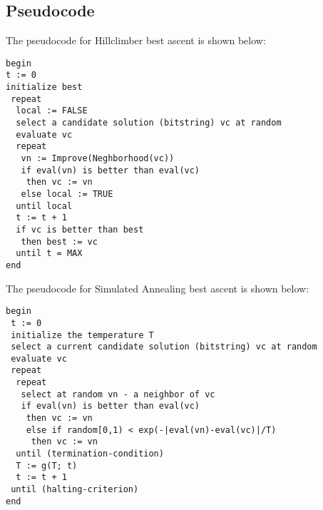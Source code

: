 \documentclass{article}
\newcommand{\code}[1]{\colorbox{codegray}{\texttt{#1}}}
\begin{document}
\subsection{Pseudocode}

The pseudocode for Hillclimber best ascent is shown below:

\begin{tabbing}
\code{begin}\\
\code{t := 0}\\
\code{initialize best}\\
\code{\ repeat}\\
\code{\ \ local := FALSE}\\
\code{\ \ select a candidate solution (bitstring) vc at random}\\
\code{\ \ evaluate vc}\\
\code{\ \ repeat}\\
\code{\ \ \ vn := Improve(Neghborhood(vc))}\\
\code{\ \ \ if eval(vn) is better than eval(vc)}\\
\code{\ \ \ \ then vc := vn}\\
\code{\ \ \ else local := TRUE}\\
\code{\ \ until local}\\
\code{\ \ t := t + 1}\\
\code{\ \ if vc is better than best}\\
\code{\ \ \ then best := vc}\\
\code{\ \ until t = MAX}\\
\code{end}\\
\end{tabbing}
The pseudocode for Simulated Annealing best ascent is shown below:

\begin{tabbing}
\code{begin}\\
\code{\ t := 0}\\
\code{\ initialize the temperature T}\\
\code{\ select a current candidate solution (bitstring) vc at random}\\
\code{\ evaluate vc}\\
\code{\ repeat}\\
\code{\ \ repeat}\\
\code{\ \ \ select at random vn - a neighbor of vc}\\
\code{\ \ \ if eval(vn) is better than eval(vc)}\\
\code{\ \ \ \ then vc := vn}\\
\code{\ \ \ \ else if random[0,1) < exp(-|eval(vn)-eval(vc)|/T)}\\
\code{\ \ \ \ \ then vc := vn}\\
\code{\ \ until (termination-condition)}\\
\code{\ \ T := g(T; t) }\\
\code{\ \ t := t + 1}\\
\code{\ until (halting-criterion)}\\
\code{end}\\
\end{tabbing}
\end{document}
